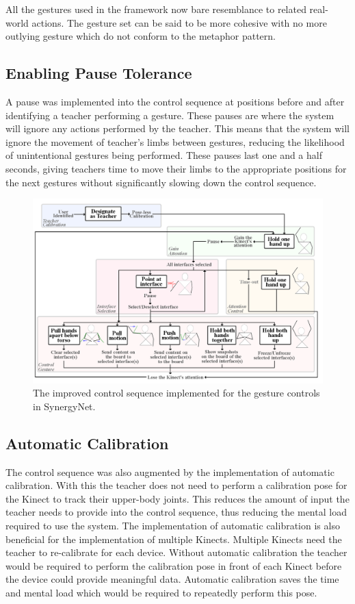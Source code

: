 \documentclass[manuscript, review, screen]{acmart}
\begin{document}
All the gestures used in the framework now bare resemblance to related real-world actions.
The gesture set can be said to be more cohesive with no more outlying gesture which do not conform to the metaphor pattern.

\subsection{Enabling Pause Tolerance}  

A pause was implemented into the control sequence at positions before and after identifying a teacher performing a gesture.
These pauses are where the system will ignore any actions performed by the teacher.
This means that the system will ignore the movement of teacher's limbs between gestures, reducing the likelihood of unintentional gestures being performed.
These pauses last one and a half seconds, giving teachers time to move their limbs to the appropriate positions for the next gestures without significantly slowing down the control sequence.

\begin{figure}[t]
  \centering
  \includegraphics[width=1\textwidth]{figures/control_sequence_flow_diagram.png}
  \caption{The improved control sequence implemented for the gesture controls in SynergyNet.}
  \label{fig:controlSequenceFlowDiagram}
\end{figure}

\subsection{Automatic Calibration}  

The control sequence was also augmented by the implementation of automatic calibration.
With this the teacher does not need to perform a calibration pose for the Kinect to track their upper-body joints.
This reduces the amount of input the teacher needs to provide into the control sequence, thus reducing the mental load required to use the system.
The implementation of automatic calibration is also beneficial for the implementation of multiple Kinects.
Multiple Kinects need the teacher to re-calibrate for each device.
Without automatic calibration the teacher would be required to perform the calibration pose in front of each Kinect before the device could provide meaningful data.
Automatic calibration saves the time and mental load which would be required to repeatedly perform this pose.
\end{document}
